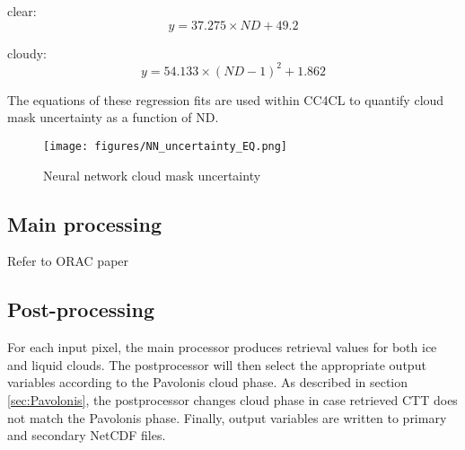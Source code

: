clear:
\begin{equation}
  y = 37.275 \times ND + 49.2
\end{equation}

cloudy:
\begin{equation}
  y = 54.133 \times (ND-1)^2 + 1.862
\end{equation}

The equations of these regression fits are used within CC4CL to quantify cloud mask uncertainty as a function of ND.

\begin{figure}[h]
  \texttt{[image: figures/NN\_uncertainty\_EQ.png]}
  \caption{Neural network cloud mask uncertainty}
  \label{fig:NN_unc}
\end{figure}

\subsection{Main processing}
Refer to ORAC paper
\subsection{Post-processing}
For each input pixel, the main processor produces retrieval values for both ice and liquid clouds. The postprocessor will then select the appropriate output variables according to the Pavolonis cloud phase. As described in section \ref{sec:Pavolonis}, the postprocessor changes cloud phase in case retrieved CTT does not match the Pavolonis phase. Finally, output variables are written to primary and secondary NetCDF files.

